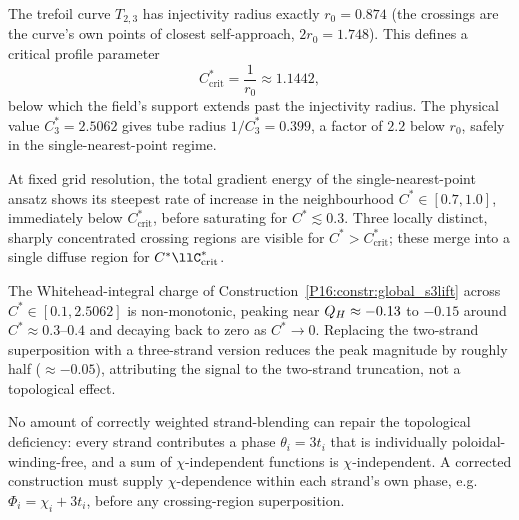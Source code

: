 \begin{proposition}
\label{P16:prop:cstar_crit}
The trefoil curve $T_{2,3}$ has injectivity radius exactly $r_0=0.874$
(the crossings are the curve's own points of closest self-approach,
$2r_0=1.748$). This defines a critical profile parameter
\begin{equation}
  C^*_{\mathrm{crit}} = \frac{1}{r_0} \approx 1.1442,
\end{equation}
below which the field's support extends past the injectivity radius.
The physical value $C_3^*=2.5062$ gives tube radius $1/C_3^*=0.399$,
a factor of $2.2$ below $r_0$, safely in the single-nearest-point regime.
\end{proposition}

\begin{remark}
\label{P16:rem:cstar_energy_signature}
At fixed grid resolution, the total gradient energy of the
single-nearest-point ansatz shows its steepest rate of increase in the
neighbourhood $C^*\in[0.7,1.0]$, immediately below $C^*_{\mathrm{crit}}$,
before saturating for $C^*\lesssim0.3$. Three locally distinct, sharply
concentrated crossing regions are visible for $C^*>C^*_{\mathrm{crit}}$;
these merge into a single diffuse region for $C^*\llC^*_{\mathrm{crit}}$.
\end{remark}

\begin{proposition}
\label{P16:prop:cstar_artifact}
The Whitehead-integral charge of Construction~\ref{P16:constr:global_s3lift}
across $C^*\in[0.1,2.5062]$ is non-monotonic, peaking near
$Q_H\approx-0.13$ to $-0.15$ around $C^*\approx0.3$--$0.4$ and
decaying back to zero as $C^*\to0$. Replacing the two-strand
superposition with a three-strand version reduces the peak magnitude
by roughly half ($\approx-0.05$), attributing the signal to the
two-strand truncation, not a topological effect.
\end{proposition}

\begin{remark}
\label{P16:rem:blending_insufficient}
No amount of correctly weighted strand-blending can repair the topological
deficiency: every strand contributes a phase $\theta_i=3t_i$ that is
individually poloidal-winding-free, and a sum of $\chi$-independent
functions is $\chi$-independent. A corrected construction must supply
$\chi$-dependence within each strand's own phase, e.g.\
$\Phi_i=\chi_i+3t_i$, before any crossing-region superposition.
\end{remark}

